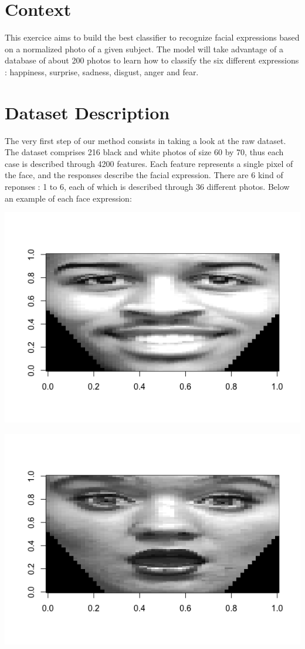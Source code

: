 \documentclass[]{report}
\begin{document}
\tableofcontents



\section{Context}
This exercice aims to build the best classifier to recognize facial expressions based on a normalized photo of a given subject. The model will take advantage of a database of about 200 photos to learn how to classify the six different expressions : happiness, surprise, sadness, disgust, anger and fear.

\section{Dataset Description}
The very first step of our method consists in taking a look at the raw dataset. The dataset comprises 216 black and white photos of size 60 by 70, thus each case is described through 4200 features. Each feature represents a single pixel of the face, and the responses describe the facial expression. There are 6 kind of reponses : 1 to 6, each of which is described through 36 different photos. Below an example of each face expression:


\begin{center}
	\includegraphics[width=0.6\linewidth]{Figures/happy_X32_y1.png}
	\label{fig:y=1}
\end{center}

\begin{center}
	\includegraphics[width=0.6\linewidth]{Figures/shocked_X8_y2.png}
	\label{fig:y=2}
\end{center}
\end{document}
